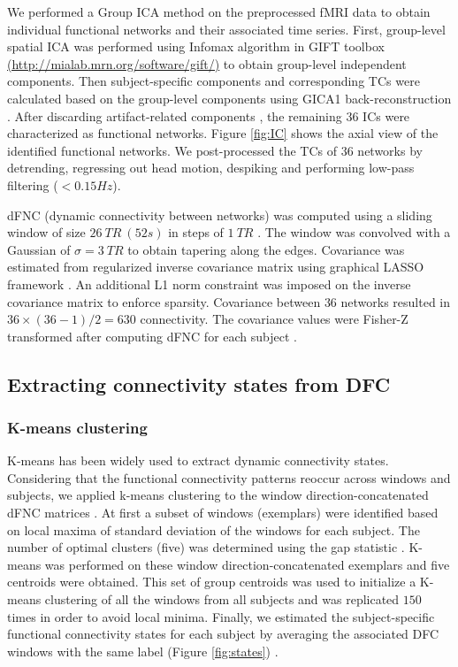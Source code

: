 \documentclass{article}
\begin{document}
We performed a Group \ac{ICA} method on the preprocessed \ac{fMRI} data to obtain individual functional networks and their associated time series. First, group-level spatial ICA was performed using Infomax algorithm \cite{bell_information-maximization_1995} in \acs{GIFT} toolbox \href{http://mialab.mrn.org/software/gift/}{(http://mialab.mrn.org/software/gift/)} to obtain group-level independent components. Then subject-specific components and corresponding \acp{TC} were calculated based on the group-level components using GICA1 back-reconstruction \cite{calhoun_spatial_2001}. After discarding artifact-related components \cite{allen_baseline_2011}, the remaining $36$ \acp{IC} were characterized as functional networks. Figure \ref{fig:IC} shows the axial view of the identified functional networks. We post-processed the \acp{TC} of $36$ networks by detrending, regressing out head motion, despiking and performing low-pass filtering ($<0.15Hz$).

\ac{dFNC} (dynamic connectivity between networks) was computed using a sliding window of size $26\: TR\: (52s)$ in steps of $1\: TR$ \cite{allen_tracking_2014}. The window was convolved with a Gaussian of $\sigma = 3\: TR$ to obtain tapering along the edges. Covariance was estimated from regularized inverse covariance matrix \cite{smith_network_2011} \cite{varoquaux_brain_2010} using graphical LASSO framework \cite{friedman_sparse_2008}. An additional L1 norm constraint was imposed on the inverse covariance matrix to enforce sparsity. Covariance between $36$ networks resulted in $36\times(36-1)/2=630$ connectivity. The covariance values were Fisher-Z transformed after computing \ac{dFNC} for each subject \cite{damaraju_dynamic_2014}.

\subsection{Extracting connectivity states from \acs{DFC}}
\label{sec:Clustering}

\subsubsection{K-means clustering}
\label{sec:K2}

K-means has been widely used to extract dynamic connectivity states.  Considering that the functional connectivity patterns reoccur across windows and subjects, we applied k-means clustering to the window direction-concatenated \ac{dFNC} matrices \cite{damaraju_dynamic_2014}. At first a subset of windows (exemplars) were identified based on local maxima of standard deviation of the windows for each subject. The number of optimal clusters (five) was determined using the gap statistic \cite{tibshirani_estimating_2001}. K-means was performed on these window direction-concatenated exemplars and five centroids were obtained. This set of group centroids was used to initialize a K-means clustering of all the windows from all subjects and was replicated $150$ times in order to avoid local minima. Finally, we estimated the subject-specific functional connectivity states for each subject by averaging the associated \ac{DFC} windows with the same label (Figure \ref{fig:states}) \cite{du_interaction_2016}.
\end{document}
